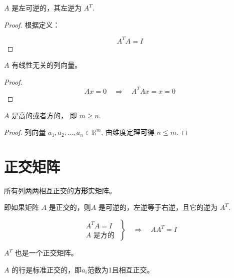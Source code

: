 \begin{theorem}
    $ A $ 是左可逆的，其左逆为 $ A^{T} $.
\end{theorem}

\begin{proof}
    根据定义：

$$
A^{T} A=I
$$
\end{proof}

\begin{theorem}
    $ A $ 有线性无关的列向量。
\end{theorem}

\begin{proof}
    $$
A x=0 \quad \Rightarrow \quad A^{T} A x=x=0
$$
\end{proof}

\begin{theorem}
    $A$ 是高的或者方的， 即 $m \geq n$.
\end{theorem}

\begin{proof}
    列向量 $ a_{1}, a_{2}, \ldots, a_{n} \in \mathbb{R}^{m} $, 由维度定理可得 $ n \leq m $.
\end{proof}

\section{正交矩阵}

\begin{definition}[正交矩阵]
    所有列两两相互正交的\textbf{方形}实矩阵。
\end{definition}

\begin{theorem}[正交矩阵满足非奇异性]
    
    即如果矩阵 $ A $ 是正交的，则$ A $ 是可逆的，左逆等于右逆，且它的逆为 $ A^{T} $.

    $$ \left.\begin{array}{l}A^{T} A=I \\ A \text { 是方的 }\end{array}\right\} \quad \Rightarrow \quad A A^{T}=I $$
\end{theorem}

\begin{corollary}
    $ A^{T} $ 也是一个正交矩阵。
\end{corollary}

\begin{corollary}
    $ A $ 的行是标准正交的，即$a_i$范数为1且相互正交。
\end{corollary}

